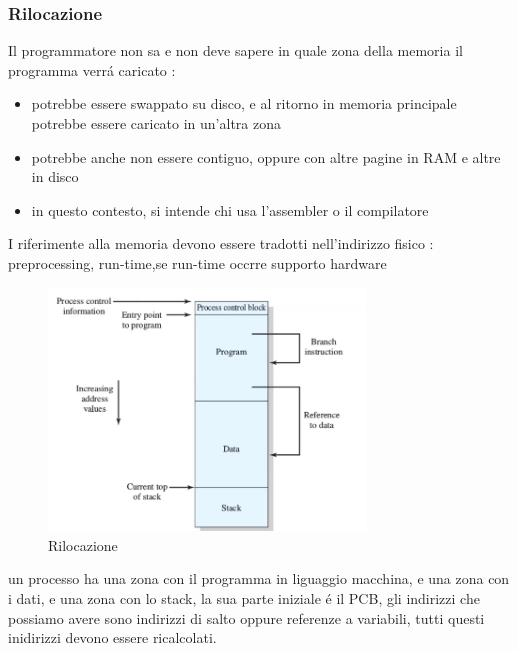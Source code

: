     \subsubsection{Rilocazione}
    Il programmatore non sa e non deve sapere in quale zona della memoria il programma verrá caricato :
    \begin{itemize}
        \item potrebbe essere swappato su disco, e al ritorno in memoria principale potrebbe essere caricato in un'altra zona
        \item potrebbe anche non essere contiguo, oppure con altre pagine in RAM e altre in disco
        \item in questo contesto, si intende chi usa l'assembler o il compilatore
    \end{itemize}
    I riferimente alla memoria devono essere tradotti nell'indirizzo fisico : preprocessing, run-time,se run-time occrre supporto hardware
    \begin{figure}[H]
        \centering
        \includegraphics[width=0.75\textwidth]{immagini/RilocazioneIndirizziNeiProgrammi}
        \caption{Rilocazione}
    \end{figure}
    un processo ha una zona con il programma in liguaggio macchina, e una zona con i dati, e una zona con lo stack, la sua parte iniziale
    é il PCB, gli indirizzi che possiamo avere sono indirizzi di salto oppure referenze a variabili, tutti questi inidirizzi
    devono essere ricalcolati.

